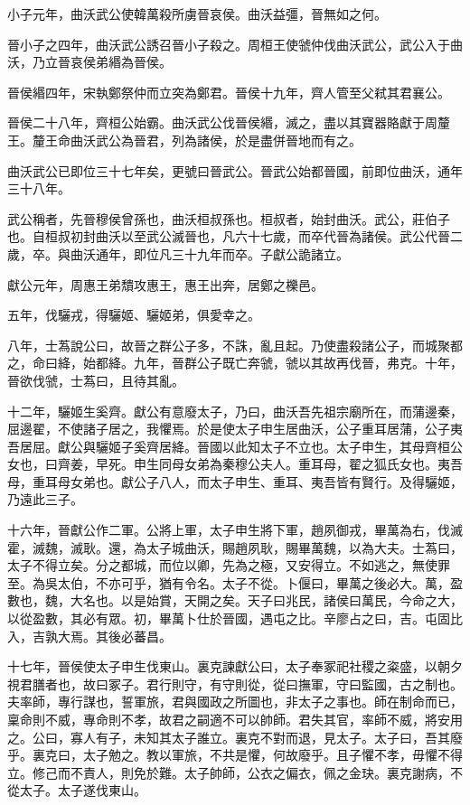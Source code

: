 小子元年，曲沃武公使韓萬殺所虜晉哀侯。曲沃益彊，晉無如之何。

晉小子之四年，曲沃武公誘召晉小子殺之。周桓王使虢仲伐曲沃武公，武公入于曲沃，乃立晉哀侯弟緡為晉侯。

晉侯緡四年，宋執鄭祭仲而立突為鄭君。晉侯十九年，齊人管至父弒其君襄公。

晉侯二十八年，齊桓公始霸。曲沃武公伐晉侯緡，滅之，盡以其寶器賂獻于周釐王。釐王命曲沃武公為晉君，列為諸侯，於是盡併晉地而有之。

曲沃武公已即位三十七年矣，更號曰晉武公。晉武公始都晉國，前即位曲沃，通年三十八年。

武公稱者，先晉穆侯曾孫也，曲沃桓叔孫也。桓叔者，始封曲沃。武公，莊伯子也。自桓叔初封曲沃以至武公滅晉也，凡六十七歲，而卒代晉為諸侯。武公代晉二歲，卒。與曲沃通年，即位凡三十九年而卒。子獻公詭諸立。

獻公元年，周惠王弟穨攻惠王，惠王出奔，居鄭之櫟邑。

五年，伐驪戎，得驪姬、驪姬弟，俱愛幸之。

八年，士蒍說公曰，故晉之群公子多，不誅，亂且起。乃使盡殺諸公子，而城聚都之，命曰絳，始都絳。九年，晉群公子既亡奔虢，虢以其故再伐晉，弗克。十年，晉欲伐虢，士蒍曰，且待其亂。

十二年，驪姬生奚齊。獻公有意廢太子，乃曰，曲沃吾先祖宗廟所在，而蒲邊秦，屈邊翟，不使諸子居之，我懼焉。於是使太子申生居曲沃，公子重耳居蒲，公子夷吾居屈。獻公與驪姬子奚齊居絳。晉國以此知太子不立也。太子申生，其母齊桓公女也，曰齊姜，早死。申生同母女弟為秦穆公夫人。重耳母，翟之狐氏女也。夷吾母，重耳母女弟也。獻公子八人，而太子申生、重耳、夷吾皆有賢行。及得驪姬，乃遠此三子。

十六年，晉獻公作二軍。公將上軍，太子申生將下軍，趙夙御戎，畢萬為右，伐滅霍，滅魏，滅耿。還，為太子城曲沃，賜趙夙耿，賜畢萬魏，以為大夫。士蒍曰，太子不得立矣。分之都城，而位以卿，先為之極，又安得立。不如逃之，無使罪至。為吳太伯，不亦可乎，猶有令名。太子不從。卜偃曰，畢萬之後必大。萬，盈數也，魏，大名也。以是始賞，天開之矣。天子曰兆民，諸侯曰萬民，今命之大，以從盈數，其必有眾。初，畢萬卜仕於晉國，遇屯之比。辛廖占之曰，吉。屯固比入，吉孰大焉。其後必蕃昌。

十七年，晉侯使太子申生伐東山。裏克諫獻公曰，太子奉冢祀社稷之粢盛，以朝夕視君膳者也，故曰冢子。君行則守，有守則從，從曰撫軍，守曰監國，古之制也。夫率師，專行謀也，誓軍旅，君與國政之所圖也，非太子之事也。師在制命而已，稟命則不威，專命則不孝，故君之嗣適不可以帥師。君失其官，率師不威，將安用之。公曰，寡人有子，未知其太子誰立。裏克不對而退，見太子。太子曰，吾其廢乎。裏克曰，太子勉之。教以軍旅，不共是懼，何故廢乎。且子懼不孝，毋懼不得立。修己而不責人，則免於難。太子帥師，公衣之偏衣，佩之金玦。裏克謝病，不從太子。太子遂伐東山。

